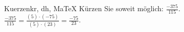 \begin{MAufgabe}{Kuerzen}{kr, dh, MaTeX}
K\"urzen Sie soweit m\"oglich: $\frac{-375}{115}$.\\ 
\ifLsg\MLoesung
\quad $\frac{-375}{115}=\frac{(5)\cdot(-75)}{(5)\cdot(23)}=\frac{-75}{23}$.\else\relax\fi
 \end{MAufgabe}